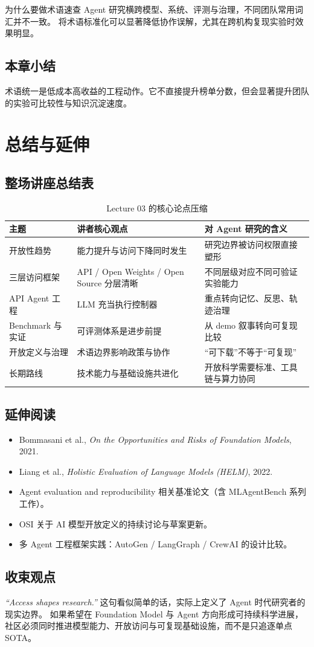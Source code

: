 \documentclass[a4paper]{article}
\begin{document}
\begin{knowledgebox}{为什么要做术语速查}
Agent 研究横跨模型、系统、评测与治理，不同团队常用词汇并不一致。  
将术语标准化可以显著降低协作误解，尤其在跨机构复现实验时效果明显。
\end{knowledgebox}

\subsection{本章小结}
术语统一是低成本高收益的工程动作。它不直接提升榜单分数，但会显著提升团队的实验可比较性与知识沉淀速度。


\section{总结与延伸}

\subsection{整场讲座总结表}
\begin{table}[H]
\centering
\begin{tabular}{p{2.8cm}p{4.1cm}p{4.6cm}}
\toprule
\textbf{主题} & \textbf{讲者核心观点} & \textbf{对 Agent 研究的含义} \\
\midrule
开放性趋势 & 能力提升与访问下降同时发生 & 研究边界被访问权限直接塑形 \\
三层访问框架 & API / Open Weights / Open Source 分层清晰 & 不同层级对应不同可验证实验能力 \\
API Agent 工程 & LLM 充当执行控制器 & 重点转向记忆、反思、轨迹治理 \\
Benchmark 与实证 & 可评测体系是进步前提 & 从 demo 叙事转向可复现比较 \\
开放定义与治理 & 术语边界影响政策与协作 & “可下载”不等于“可复现” \\
长期路线 & 技术能力与基础设施共进化 & 开放科学需要标准、工具链与算力协同 \\
\bottomrule
\end{tabular}
\caption{Lecture 03 的核心论点压缩}
\end{table}

\subsection{延伸阅读}
\begin{itemize}
    \item Bommasani et al., \textit{On the Opportunities and Risks of Foundation Models}, 2021.
    \item Liang et al., \textit{Holistic Evaluation of Language Models (HELM)}, 2022.
    \item Agent evaluation and reproducibility 相关基准论文（含 MLAgentBench 系列工作）。
    \item OSI 关于 AI 模型开放定义的持续讨论与草案更新。
    \item 多 Agent 工程框架实践：AutoGen / LangGraph / CrewAI 的设计比较。
\end{itemize}

\subsection{收束观点}
\textit{``Access shapes research.''} 这句看似简单的话，实际上定义了 Agent 时代研究者的现实边界。  
如果希望在 Foundation Model 与 Agent 方向形成可持续科学进展，社区必须同时推进模型能力、开放访问与可复现基础设施，而不是只追逐单点 SOTA。

\end{document}
